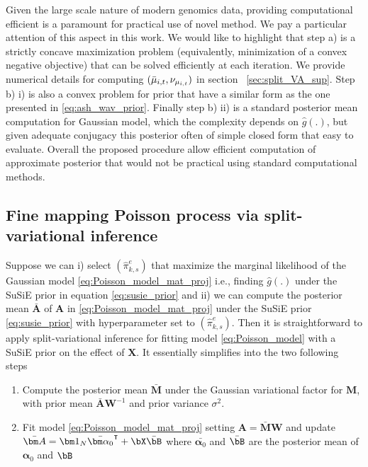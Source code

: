 Given the large scale nature of modern genomics data, providing  computational efficient is a paramount for practical use of novel method. We pay a particular attention of this aspect in this work. We would like to highlight that  step a) is a strictly concave maximization problem (equivalently, minimization of a convex negative objective) that can be solved efficiently at each iteration.  We provide numerical details for computing $( \Bar{\mu}_{i,t} ,  \nu _{\mu_{i,t}})$  in section ~\ref{sec:split_VA_sup}.  Step  b) i) is also a convex problem \citep{kim_fast_2019} for prior that have a similar form as the one presented in \ref{eq:ash_wav_prior}. Finally  step b) ii) is a standard posterior mean computation for Gaussian model, which the complexity depends on $\hat{g}(.)$, but given adequate conjugacy this posterior often of simple closed form that easy to evaluate. Overall the proposed procedure allow efficient computation of approximate posterior that would not be practical using standard computational methods.
 

\subsection{Fine mapping Poisson process via split-variational inference }


Suppose we can i) select  $  (\hat{\pi}^e_{k,s})$  that maximize the marginal likelihood of the Gaussian model \ref{eq:Poisson_model_mat_proj} i.e., finding  $\hat g (.) $ under the SuSiE prior in equation \ref{eq:susie_prior}  and ii) we can  compute the posterior mean $\bar{ \bm A}$ of  $\bm A$ in \ref{eq:Poisson_model_mat_proj} under the SuSiE prior \ref{eq:susie_prior} with hyperparameter set to  $  (\hat{\pi}^e_{k,s})$. Then it is straightforward to apply split-variational inference for fitting model \ref{eq:Poisson_model} with a SuSiE prior on the effect of $\bm X $. It essentially simplifies into the two following steps


\begin{enumerate}
    \item Compute the posterior mean $\bar {\bm M} $ under the Gaussian variational factor for ${\bm M}$, with prior mean $\bar{\bm A}\bm W^{-1}$ and prior variance $\sigma^2$.

    \item Fit model \ref{eq:Poisson_model_mat_proj} setting $\bm A =\bar {\bm M} \bm W $  and update $ \bar{ \bm A} ={\bm 1}_N\bar {\bm\alpha_0}^{\intercal} +    \bX\bar{\bB} $  where $\bar {\bm\alpha_0}$ and  $\bar{\bB}$ are the posterior mean of $\bm\alpha_0$ and $\bB$
\end{enumerate}



